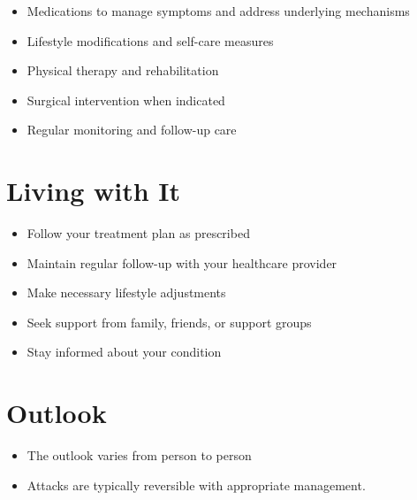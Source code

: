 \begin{itemize}[noitemsep]
  \item Medications to manage symptoms and address underlying mechanisms
  \item Lifestyle modifications and self-care measures
  \item Physical therapy and rehabilitation
  \item Surgical intervention when indicated
  \item Regular monitoring and follow-up care
\end{itemize}
\section{Living with It}
\begin{itemize}[noitemsep]
  \item Follow your treatment plan as prescribed
  \item Maintain regular follow-up with your healthcare provider
  \item Make necessary lifestyle adjustments
  \item Seek support from family, friends, or support groups
  \item Stay informed about your condition
\end{itemize}
\section{Outlook}
\begin{itemize}[noitemsep]
  \item The outlook varies from person to person
  \item Attacks are typically reversible with appropriate management.
\end{itemize}
